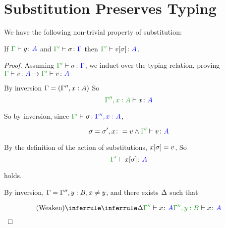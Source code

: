 \documentclass{report}
\begin{document}
   
    

\section{Substitution Preserves Typing}
We have the following non-trivial property of substitution:


\begin{theorem}\label{SubsTyping}

    If $\typerelation{\G}{g}{A}$ and $\typerelation{\G'}{\si}{\G}$ then $\typerelation{\G'}{v\ssi}{A}$.
\end{theorem}



\begin{framed}
    \begin{proof}
        
        Assuming $\typerelation{\G'}{\si}{\G}$, we induct over the typing relation, proving $\gtyperelation{v}{A}\rightarrow\typerelation{\G'}{v}{A}$
        
            \case{\vvar}
                By inversion $\Gamma = (\Gamma'', x:A)$
                So \begin{equation}
                    \typerelation{\G'',x:A}{x}{A}
                \end{equation}
        
                So by inversion, since $\typerelation{\G'}{\si}{\G'', x:A}$, 
        
                \begin{equation}
                    \si = \si', x\setto v \wedge \typerelation{\G'}{v}{A}
                \end{equation}
        
                By the definition of the action of substitutions, $x[\sigma] = v$, So
                \begin{equation}
                    \typerelation{\G'}{x\ssi}{A}
                \end{equation}
        
                holds.
                
            \case{\vweaken}
                By inversion, $\Gamma = \Gamma'', y: B, x \neq y$, and there exists $\Delta$ such that
        
                \begin{equation}
                    \ntreeruleI{\vweaken}{\treeruleI{\D}{\typerelation{\G''}{x}{A}}}{\typerelation{\G'', y: B}{x}{A}}
                \end{equation}
        

\end{proof}
\end{framed}
\end{document}
